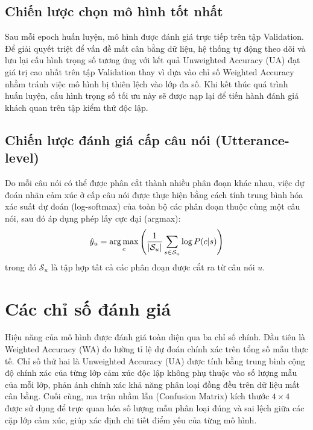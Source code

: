 \subsection{Chiến lược chọn mô hình tốt nhất}

Sau mỗi epoch huấn luyện, mô hình được đánh giá trực tiếp trên tập Validation. Để giải quyết triệt để vấn đề mất cân bằng dữ liệu, hệ thống tự động theo dõi và lưu lại cấu hình trọng số tương ứng với kết quả Unweighted Accuracy (UA) đạt giá trị cao nhất trên tập Validation thay vì dựa vào chỉ số Weighted Accuracy nhằm tránh việc mô hình bị thiên lệch vào lớp đa số. Khi kết thúc quá trình huấn luyện, cấu hình trọng số tối ưu này sẽ được nạp lại để tiến hành đánh giá khách quan trên tập kiểm thử độc lập.

\subsection{Chiến lược đánh giá cấp câu nói (Utterance-level)}

Do mỗi câu nói có thể được phân cắt thành nhiều phân đoạn khác nhau, việc dự đoán nhãn cảm xúc ở cấp câu nói được thực hiện bằng cách tính trung bình hóa xác suất dự đoán (log-softmax) của toàn bộ các phân đoạn thuộc cùng một câu nói, sau đó áp dụng phép lấy cực đại (argmax):
\begin{equation}
    \hat{y}_u = \operatorname*{arg\,max}_c \left( \frac{1}{|\mathcal{S}_u|} \sum_{s \in \mathcal{S}_u} \log P(c | s) \right)
    \label{eq:utt_pred}
\end{equation}
trong đó $\mathcal{S}_u$ là tập hợp tất cả các phân đoạn được cắt ra từ câu nói $u$.


\section{Các chỉ số đánh giá}
\label{sec:metrics}

Hiệu năng của mô hình được đánh giá toàn diện qua ba chỉ số chính. Đầu tiên là Weighted Accuracy (WA) đo lường tỉ lệ dự đoán chính xác trên tổng số mẫu thực tế. Chỉ số thứ hai là Unweighted Accuracy (UA) được tính bằng trung bình cộng độ chính xác của từng lớp cảm xúc độc lập không phụ thuộc vào số lượng mẫu của mỗi lớp, phản ánh chính xác khả năng phân loại đồng đều trên dữ liệu mất cân bằng. Cuối cùng, ma trận nhầm lẫn (Confusion Matrix) kích thước $4 \times 4$ được sử dụng để trực quan hóa số lượng mẫu phân loại đúng và sai lệch giữa các cặp lớp cảm xúc, giúp xác định chi tiết điểm yếu của từng mô hình.
